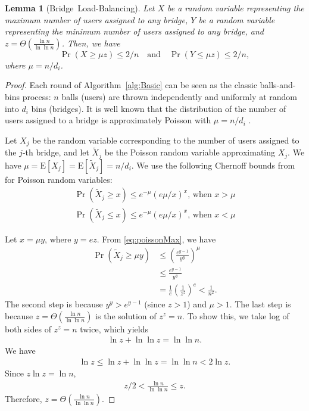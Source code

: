 \documentclass{sig-alternate-05-2015}
\newcommand{\E}{\mathbf{\mathrm{E}}}
\newtheorem{lemma}{Lemma}
\newcommand{\sfsize}{\fontsize{0.8\baselineskip}{0.68\baselineskip}\selectfont}
\newcommand{\sans}[1]{\textsf{\sfsize \mbox{#1}}}
\begin{document}
\begin{lemma}[\sans{Bridge Load-Balancing}]
	Let $X$ be a random variable representing the maximum number of users assigned to any bridge, $Y$ be a random variable representing the minimum number of users assigned to any bridge, and $z = \Theta\left(\frac{\ln{n}}{\ln{\ln{n}}}\right)$. Then, we have 
	\[
	\Pr\left(X \geq \mu z\right) \leq 2/n \quad \text{and} \quad 
	\Pr\left(Y \leq \mu z\right) \leq 2/n,
	\]
	where ${\mu = n/d_i}$.
\end{lemma}
\begin{proof}
	Each round of Algorithm~\ref{alg:Basic} can be seen as the classic balls-and-bins process: $n$ balls (users) are thrown independently and uniformly at random into $d_i$ bins (bridges). It is well known that the distribution of the number of users assigned to a bridge is approximately Poisson with ${\mu = n/d_i}$ \cite[Chapter~5]{Michael2005}.
	
	Let $X_j$ be the random variable corresponding to the number of users assigned to the $j$-th bridge, and let $\tilde{X}_j$ be the Poisson random variable approximating $X_j$. We have ${\mu = \E[X_j] = \E[\tilde{X}_j] = n/d_i}$. We use the following Chernoff bounds from \cite[Chapter~5]{Michael2005} for Poisson random variables:
	\begin{align}
		\Pr(\tilde{X}_j \geq x) \leq e^{-\mu}(e\mu/x)^x \text{, when } x > \mu \label{eq:poissonMax}\\
		\Pr(\tilde{X}_j \leq x) \leq e^{-\mu}(e\mu/x)^x \text{, when } x < \mu \label{eq:poissonMin}
	\end{align}
	
	\noindent Let ${x = \mu y}$, where ${y = ez}$. From \eqref{eq:poissonMax}, we have
	\begin{align}
		\Pr(\tilde{X}_j \geq \mu y) &\leq \left(\frac{e^{y-1}}{y^y}\right)^\mu \nonumber \\
		&\leq \frac{e^{y-1}}{y^y} \nonumber \\ 
		&= \frac{1}{e}\left(\frac{1}{z^z}\right)^e < \frac{1}{n^2}. \label{eq:approxBound}
	\end{align}
	The second step is because ${y^y > e^{y-1}}$ (since ${z > 1}$) and ${\mu > 1}$. The last step is because ${z = \Theta\left(\frac{\ln{n}}{\ln{\ln{n}}}\right)}$ is the solution of ${z^z = n}$. To show this, we take log of both sides of ${z^z = n}$ twice, which yields
	\begin{align*}
		\ln{z} + \ln{\ln{z}} = \ln{\ln{n}}.
	\end{align*}
	We have
	\begin{align*}
		\ln{z} \leq \ln{z} + \ln{\ln{z}} = \ln{\ln{n}} < 2\ln{z}.
	\end{align*}
	Since $z\ln{z} = \ln{n}$,
	\begin{align*}
		z/2 < \frac{\ln{n}}{\ln{\ln{n}}} \leq z.
	\end{align*}
	Therefore, $z = \Theta\left(\frac{\ln{n}}{\ln{\ln{n}}}\right)$. 
	

\end{proof}
\end{document}
